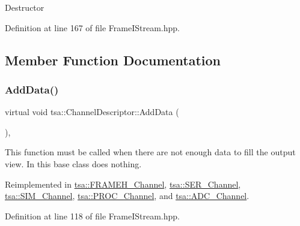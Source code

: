 Destructor 

Definition at line 167 of file Frame\+I\+Stream.\+hpp.



\subsection{Member Function Documentation}
\mbox{\label{classtsa_1_1_channel_descriptor_aa1e001a5e712415cd4e9d66846914a56}} 
\subsubsection{\texorpdfstring{Add\+Data()}{AddData()}}
{\footnotesize\ttfamily virtual void tsa\+::\+Channel\+Descriptor\+::\+Add\+Data (\begin{DoxyParamCaption}{ }\end{DoxyParamCaption})\hspace{0.3cm}{\ttfamily [inline]}, {\ttfamily [virtual]}}

This function must be called when there are not enough data to fill the output view. In this base class does nothing. 

Reimplemented in \hyperlink{classtsa_1_1_f_r_a_m_e_h___channel_af757e23c465da95ac0ed7b97876ead66}{tsa\+::\+F\+R\+A\+M\+E\+H\+\_\+\+Channel}, \hyperlink{classtsa_1_1_s_e_r___channel_a77efdde9aaa7bbd356088bb1c15e59bf}{tsa\+::\+S\+E\+R\+\_\+\+Channel}, \hyperlink{classtsa_1_1_s_i_m___channel_ada133d83befff9b1bde7e13bb78df7e0}{tsa\+::\+S\+I\+M\+\_\+\+Channel}, \hyperlink{classtsa_1_1_p_r_o_c___channel_ab4f986f7829c52ca6c0d8c244be7c617}{tsa\+::\+P\+R\+O\+C\+\_\+\+Channel}, and \hyperlink{classtsa_1_1_a_d_c___channel_a23052bc47591e46246701ec0573c7902}{tsa\+::\+A\+D\+C\+\_\+\+Channel}.



Definition at line 118 of file Frame\+I\+Stream.\+hpp.

\mbox{\label{classtsa_1_1_channel_descriptor_a73d060e190a75faa7ac64ee4a328a9d4}} 
